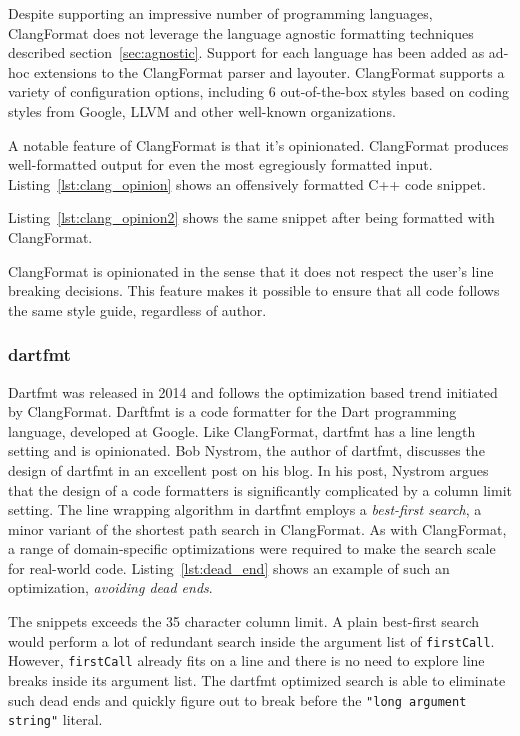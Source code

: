 Despite supporting an impressive number of programming languages, ClangFormat does not leverage the language agnostic formatting techniques described section~\ref{sec:agnostic}.
Support for each language has been added as ad-hoc extensions to the ClangFormat parser and layouter.
ClangFormat supports a variety of configuration options, including 6 out-of-the-box styles based on coding styles from Google, LLVM and other well-known organizations.

A notable feature of ClangFormat is that it's opinionated.
ClangFormat produces well-formatted output for even the most egregiously formatted input.
Listing~\ref{lst:clang_opinion} shows an offensively formatted C++ code snippet.

Listing~\ref{lst:clang_opinion2} shows the same snippet after being formatted with ClangFormat.

ClangFormat is opinionated in the sense that it does not respect the user's line breaking decisions.
This feature makes it possible to ensure that all code follows the same style guide, regardless of author.

\subsubsection{dartfmt}
Dartfmt\autocite{nystrom_dart_style_2014} was released in 2014 and follows the optimization based trend initiated by ClangFormat.
Darftfmt is a code formatter for the Dart programming language, developed at Google.
Like ClangFormat, dartfmt has a line length setting and is opinionated.
Bob Nystrom, the author of dartfmt, discusses the design of dartfmt in an excellent post\autocite{nystrom_hardest_2015} on his blog.
In his post, Nystrom argues that the design of a code formatters is significantly complicated by a column limit setting.
The line wrapping algorithm in dartfmt employs a \emph{best-first search}\autocite{pearl_heuristics:_1984},
a minor variant of the shortest path search in ClangFormat.
As with ClangFormat, a range of domain-specific optimizations were required to make the search scale for real-world code.
Listing~\ref{lst:dead_end} shows an example of such an optimization, \emph{avoiding dead ends}.

The snippets exceeds the 35 character column limit.
A plain best-first search would perform a lot of redundant search inside the argument list of \texttt{firstCall}.
However, \texttt{firstCall} already fits on a line and there is no need to explore line breaks inside its argument list.
The dartfmt optimized search is able to eliminate such dead ends and quickly figure out to break before the \texttt{"long argument string"} literal.

